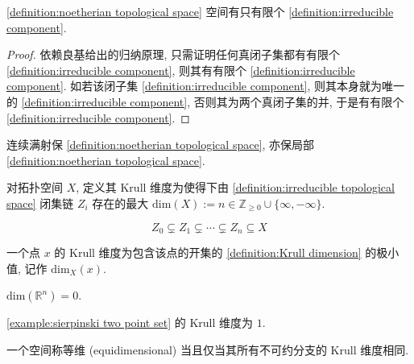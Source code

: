 \begin{lemma}
    \ref{definition:noetherian topological space} 空间有只有限个 \ref{definition:irreducible component}.

    \begin{proof}
        依赖良基给出的归纳原理, 只需证明任何真闭子集都有有限个 \ref{definition:irreducible component}, 则其有有限个 \ref{definition:irreducible component}.
        如若该闭子集 \ref{definition:irreducible component}, 则其本身就为唯一的 \ref{definition:irreducible component}, 否则其为两个真闭子集的并, 于是有有限个 \ref{definition:irreducible component}.
    \end{proof}
\end{lemma}

\begin{lemma}
    连续满射保 \ref{definition:noetherian topological space}, 亦保局部 \ref{definition:noetherian topological space}.
\end{lemma}

\begin{definition}[Krull 维度]
    \label {definition:Krull dimension}
    对拓扑空间 \(X\), 定义其 Krull 维度为使得下由 \ref{definition:irreducible topological space} 闭集链 \(Z_i\) 存在的最大 \(\mathrm{dim} (X) := n \in \mathbb{Z}_{\geq 0} \cup \{\infty, - \infty\}\).

    \[
        Z_0 \subsetneq Z_1 \subsetneq \cdots \subsetneq Z_n \subseteq X
    \]
\end{definition}

\begin{definition}
    一个点 \(x\) 的 Krull 维度为包含该点的开集的 \ref{definition:Krull dimension} 的极小值,
    记作 \(\mathrm{dim}_X (x)\).
\end{definition}

\begin{example}
    \(\mathrm{dim} (\mathbb{R}^n) = 0\).
\end{example}

\begin{example}
    \ref{example:sierpinski two point set} 的 Krull 维度为 \(1\).
\end{example}

\begin{definition}[等维]
    \label {definition:equidimensional topological space}
    一个空间称等维 (equidimensional) 当且仅当其所有不可约分支的 Krull 维度相同.
\end{definition}

